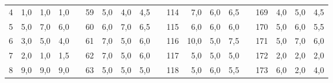 \begin{table}[H]
{\begin{tabular}{|c|r|r|r|l|c|r|r|r|l|c|r|r|r|lcrrr}
4                                                     & 1,0                                                                       & 1,0                                                                       & 1,0                                                                       &  & 59  & 5,0  & 4,0  & 4,5  &  & 114 & 7,0  & 6,0  & 6,5  & \multicolumn{1}{l|}{} & \multicolumn{1}{c|}{169} & \multicolumn{1}{r|}{4,0}  & \multicolumn{1}{r|}{5,0}  & \multicolumn{1}{r|}{4,5}  \\ \cline{1-4} \cline{6-9} \cline{11-14} \cline{16-19} 
5                                                     & 5,0                                                                       & 7,0                                                                       & 6,0                                                                       &  & 60  & 6,0  & 7,0  & 6,5  &  & 115 & 6,0  & 6,0  & 6,0  & \multicolumn{1}{l|}{} & \multicolumn{1}{c|}{170} & \multicolumn{1}{r|}{5,0}  & \multicolumn{1}{r|}{6,0}  & \multicolumn{1}{r|}{5,5}  \\ \cline{1-4} \cline{6-9} \cline{11-14} \cline{16-19} 
6                                                     & 3,0                                                                       & 5,0                                                                       & 4,0                                                                       &  & 61  & 7,0  & 5,0  & 6,0  &  & 116 & 10,0 & 5,0  & 7,5  & \multicolumn{1}{l|}{} & \multicolumn{1}{c|}{171} & \multicolumn{1}{r|}{5,0}  & \multicolumn{1}{r|}{7,0}  & \multicolumn{1}{r|}{6,0}  \\ \cline{1-4} \cline{6-9} \cline{11-14} \cline{16-19} 
7                                                     & 2,0                                                                       & 1,0                                                                       & 1,5                                                                       &  & 62  & 7,0  & 5,0  & 6,0  &  & 117 & 5,0  & 5,0  & 5,0  & \multicolumn{1}{l|}{} & \multicolumn{1}{c|}{172} & \multicolumn{1}{r|}{2,0}  & \multicolumn{1}{r|}{2,0}  & \multicolumn{1}{r|}{2,0}  \\ \cline{1-4} \cline{6-9} \cline{11-14} \cline{16-19} 
8                                                     & 9,0                                                                       & 9,0                                                                       & 9,0                                                                       &  & 63  & 5,0  & 5,0  & 5,0  &  & 118 & 5,0  & 6,0  & 5,5  & \multicolumn{1}{l|}{} & \multicolumn{1}{c|}{173} & \multicolumn{1}{r|}{6,0}  & \multicolumn{1}{r|}{2,0}  & \multicolumn{1}{r|}{4,0}  \\ \cline{1-4} \cline{6-9} \cline{11-14} \cline{16-19} 

\end{tabular}}
\end{table}
